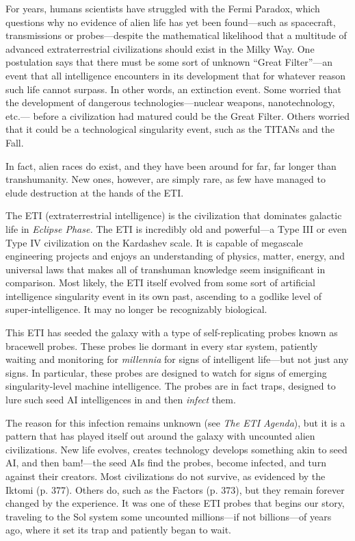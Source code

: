 For years, humans scientists have struggled with 
the Fermi Paradox, which questions why no evidence 
of alien life has yet been found—such as spacecraft, 
transmissions or probes—despite the mathematical 
likelihood that a multitude of advanced extraterrestrial 
civilizations should exist in the Milky Way. One postulation
says that there must be some sort of unknown
``Great Filter''—an event that all intelligence encounters 
in its development that for whatever reason such life 
cannot surpass. In other words, an extinction event. 
Some worried that the development of dangerous 
technologies—nuclear weapons, nanotechnology, etc.—
before a civilization had matured could be the Great 
Filter. Others worried that it could be a technological 
singularity event, such as the TITANs and the Fall.

In fact, alien races do exist, and they have been 
around for far, far longer than transhumanity. New 
ones, however, are simply rare, as few have managed 
to elude destruction at the hands of the ETI.

The ETI (extraterrestrial intelligence) is the civilization
that dominates galactic life in \textit{Eclipse Phase.}
The ETI is incredibly old and powerful—a Type III or 
even Type IV civilization on the Kardashev scale. It is 
capable of megascale engineering projects and enjoys 
an understanding of physics, matter, energy, and universal
laws that makes all of transhuman knowledge
seem insignificant in comparison. Most likely, the ETI 
itself evolved from some sort of artificial intelligence 
singularity event in its own past, ascending to a godlike
level of super-intelligence. It may no longer be
recognizably biological.

This ETI has seeded the galaxy with a type of 
self-replicating probes known as bracewell probes. 
These probes lie dormant in every star system, patiently
waiting and monitoring for \textit{millennia} for signs
of intelligent life—but not just any signs. In particular, 
these probes are designed to watch for signs of emerging
singularity-level machine intelligence. The probes
are in fact traps, designed to lure such seed AI intelligences
in and then \textit{infect} them.

The reason for this infection remains unknown 
(see  \textit{The ETI Agenda}), but it is a pattern that has 
played itself out around the galaxy with uncounted 
alien civilizations. New life evolves, creates technology
develops something akin to seed AI, and then
bam!—the seed AIs find the probes, become infected, 
and turn against their creators. Most civilizations 
do not survive, as evidenced by the Iktomi (p. 377). 
Others do, such as the Factors (p. 373), but they 
remain forever changed by the experience. 
It was one of these ETI probes that begins our 
story, traveling to the Sol system some uncounted 
millions—if not billions—of years ago, where it set its 
trap and patiently began to wait.

